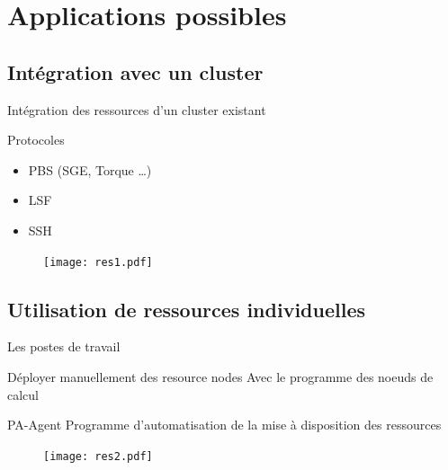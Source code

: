 \documentclass{beamer}
\begin{document}
\section[Applications]{Applications possibles}
\begin{frame}
	\tableofcontents[currentsection]
\end{frame}
\subsection{Intégration avec un cluster}
\begin{frame}{Intégration des ressources d'un cluster existant}
    \begin{block}{Protocoles}
    \begin{itemize}
        \item PBS (SGE, Torque \ldots)
        \item LSF
        \item SSH  
    \end{itemize}
        
    \end{block}
        \begin{figure}
            \centering
            \texttt{[image: res1.pdf]}
        \end{figure}
\end{frame}
\subsection{Utilisation de ressources individuelles}
\begin{frame}
	\tableofcontents[currentsubsection]
\end{frame}
\begin{frame}{Les postes de travail}
    \begin{block}{Déployer manuellement des resource nodes}
    Avec le programme des noeuds de calcul
        
    \end{block}
    \begin{block}{PA-Agent}
    Programme d'automatisation de la mise à disposition des ressources
        
    \end{block}
    \vspace{0.2cm}
        \begin{figure}
            \centering
            \texttt{[image: res2.pdf]}
        \end{figure}
\end{frame}
\end{document}
